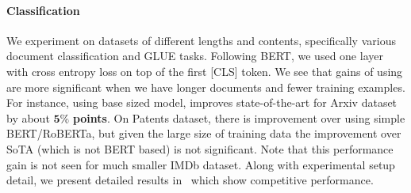 \paragraph{Classification} 
We experiment on datasets of different lengths and contents, specifically various document classification and GLUE tasks.
Following BERT, we used one layer with cross entropy loss on top of the first [CLS] token.
We see that gains of using \bigb are more significant when we have longer documents and fewer training examples.
For instance, using base sized model,
\bigb improves state-of-the-art for Arxiv dataset by about $\bm{5\%}$ \textbf{points}.
On Patents dataset, there is improvement over using simple BERT/RoBERTa, but given the large size of training data the improvement over SoTA (which is not BERT based) is not significant.
Note that this performance gain is not seen for much
smaller IMDb dataset.
Along with experimental setup detail, we present detailed results in~ which show competitive performance.


